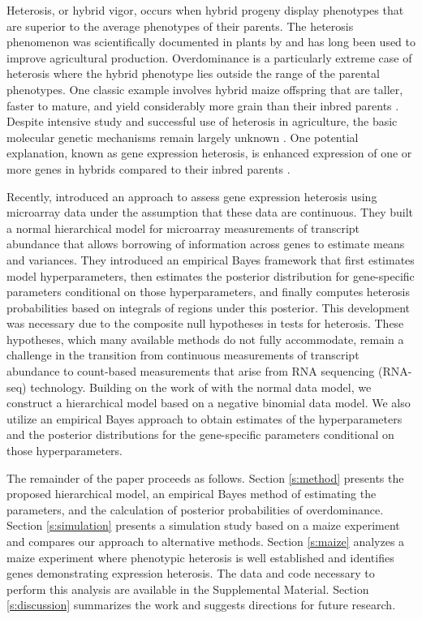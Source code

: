 \documentclass[useAMS,usenatbib,referee]{biom}
\newcommand{\RNAseq}{RNA-seq}
\begin{document}
Heterosis, or hybrid vigor, occurs when hybrid progeny display phenotypes that are superior to the average phenotypes of their parents.  The heterosis phenomenon was scientifically documented in plants by \cite{darwin1876effects} and has long been used to improve agricultural production. Overdominance is a particularly extreme case of heterosis where the hybrid phenotype lies outside the range of the parental phenotypes. One classic example involves hybrid maize offspring that are taller, faster to mature, and yield considerably more grain than their inbred parents \citep{hallauer1981quantitative, hallauer2010quantitative}.  Despite intensive study and successful use of heterosis in agriculture, the basic molecular genetic mechanisms remain largely unknown \citep{coors1999genetics, lippman2007heterosis}. One potential explanation, known as gene expression heterosis, is enhanced expression of one or more genes in hybrids compared to their inbred parents \citep{swanson2006all, springer2007allelic}.

Recently, \cite{ji2014estimation} introduced an approach to assess gene expression heterosis using microarray data under the assumption that these data are continuous. They built a normal hierarchical model for microarray measurements of transcript abundance that allows borrowing of information across genes to estimate means and variances. They introduced an empirical Bayes framework that first estimates model hyperparameters, then estimates the posterior distribution for gene-specific parameters conditional on those hyperparameters, and finally computes heterosis probabilities based on integrals of regions under this posterior. This development was necessary due to the composite null hypotheses in tests for heterosis. These hypotheses, which many available methods do not fully accommodate, remain a challenge in the transition from continuous measurements of transcript abundance to count-based measurements that arise from RNA sequencing (\RNAseq{}) technology. Building on the work of \citeauthor{ji2014estimation} with the normal data model, we construct a hierarchical model based on a negative binomial data model. We also utilize an empirical Bayes approach to obtain estimates of the hyperparameters and the posterior distributions for the gene-specific parameters conditional on those hyperparameters. 

The remainder of the paper proceeds as follows. Section \ref{s:method} presents the proposed hierarchical model, an empirical Bayes method of estimating the parameters, and the calculation of posterior probabilities of overdominance. Section \ref{s:simulation} presents a simulation study based on a maize experiment and compares our approach to alternative methods. Section \ref{s:maize} analyzes a maize experiment where phenotypic heterosis is well established and identifies genes demonstrating expression heterosis. The data and code necessary to perform this analysis are available in the Supplemental Material. Section \ref{s:discussion} summarizes the work and suggests directions for future research.
\end{document}
